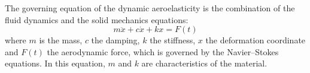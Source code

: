 
The governing equation of the dynamic aeroelasticity is
the combination of the fluid dynamics and the solid mechanics
equations:
\begin{equation}
	m \ddot{x} + c \dot{x} + k x = F(t)
	\label{eq:ael_motion_eq}
\end{equation}
where $m$ is the mass, $c$ the damping, $k$ the stiffness, $x$ the deformation
coordinate and $F(t)$ the aerodynamic force, which is governed
by the Navier--Stokes equations. In this equation, $m$
and $k$ are characteristics of the material. 